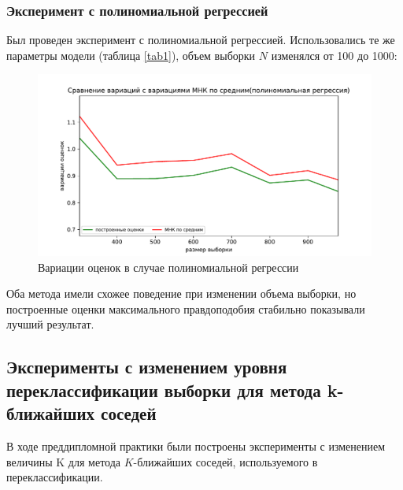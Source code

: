 \subsubsection{Эксперимент с полиномиальной регрессией}
Был проведен эксперимент с полиномиальной регрессией. Использовались те же параметры модели (таблица \ref{tab1}), объем выборки $N$ изменялся от 100 до 1000:
\begin{figure}[h!]
    \centering
    \includegraphics[width=150mm]{../images/polynomial.pdf}
    \caption{Вариации оценок в случае полиномиальной регрессии\label{overflow}}
    \label{pic3}
\end{figure}

Оба метода имели схожее поведение при изменении объема выборки, но построенные оценки максимального правдоподобия стабильно показывали лучший результат.

\newpage
\subsection{Эксперименты с изменением уровня переклассификации выборки для метода k-ближайших соседей}\label{ss3_3_1}
В ходе преддипломной практики были построены эксперименты с изменением величины K для метода $K$-ближайших соседей, используемого в переклассификации.  

